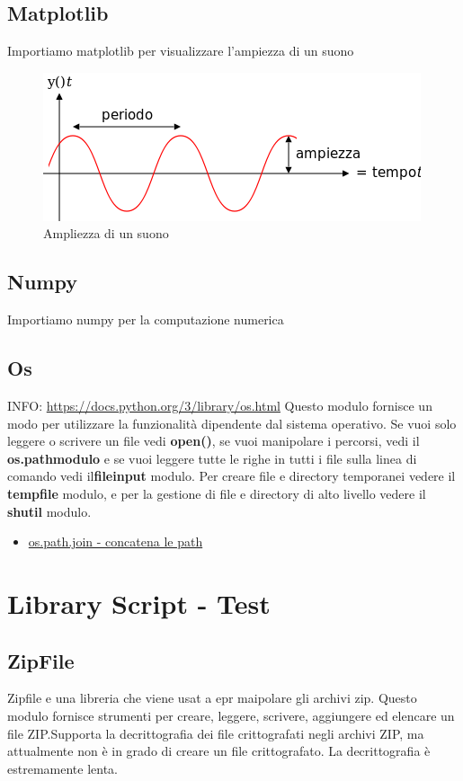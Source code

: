 \documentclass{article}
\begin{document}
\subsection{Matplotlib}
Importiamo matplotlib per visualizzare l'ampiezza di un suono
\begin{figure}[h!]
        \centering
        \includegraphics[scale= 0.2]{image/420px-Oscillazione_periodica.svg.png}
        \caption{Ampliezza di un suono}
        \label{fig:my_label}
    \end{figure}

\subsection{Numpy}
Importiamo numpy per la computazione numerica 
\subsection{Os}
INFO: \url{https://docs.python.org/3/library/os.html}
Questo modulo fornisce un modo per utilizzare la funzionalità dipendente dal sistema operativo. Se vuoi solo leggere o scrivere un file vedi \textbf{open()}, se vuoi manipolare i percorsi, vedi il \textbf{os.pathmodulo} e se vuoi leggere tutte le righe in tutti i file sulla linea di comando vedi il\textbf{fileinput} modulo. Per creare file e directory temporanei vedere il \textbf{tempfile} modulo, e per la gestione di file e directory di alto livello vedere il \textbf{shutil} modulo.
\begin{itemize}
    \item \href{ https://www.geeksforgeeks.org/python-os-path-join-method/}{os.path.join - concatena le path}
\end{itemize}
\section{Library Script - \textbf{Test}}
\subsection{ZipFile}
Zipfile e una libreria che viene usat a epr maipolare gli archivi zip. Questo modulo fornisce strumenti per creare, leggere, scrivere, aggiungere ed elencare un file ZIP.Supporta la decrittografia dei file crittografati negli archivi ZIP, ma attualmente non è in grado di creare un file crittografato. La decrittografia è estremamente lenta.
\end{document}
